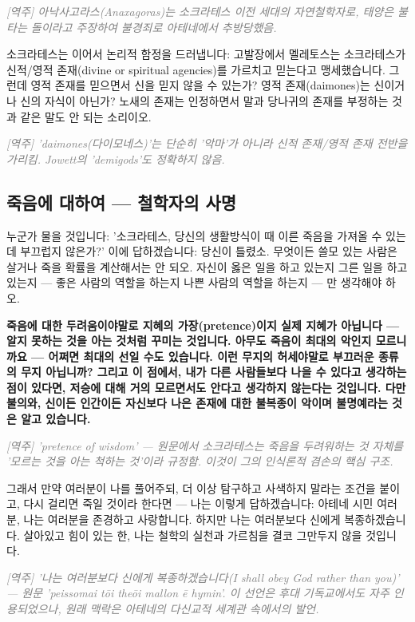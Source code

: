 \documentclass[11pt, a4paper]{article}
\newcommand{\tnote}[1]{\par\noindent\textit{\textcolor{gray}{[역주] #1}}\par\smallskip}
\begin{document}
\tnote{아낙사고라스(Anaxagoras)는 소크라테스 이전 세대의 자연철학자로, 태양은 불타는 돌이라고 주장하여 불경죄로 아테네에서 추방당했음.}


소크라테스는 이어서 논리적 함정을 드러냅니다: 고발장에서 멜레토스는 소크라테스가 신적/영적 존재(divine or spiritual agencies)를 가르치고 믿는다고 맹세했습니다. 그런데 영적 존재를 믿으면서 신을 믿지 않을 수 있는가? 영적 존재(daimones)는 신이거나 신의 자식이 아닌가? 노새의 존재는 인정하면서 말과 당나귀의 존재를 부정하는 것과 같은 말도 안 되는 소리이오.


\tnote{'daimones(다이모네스)'는 단순히 '악마'가 아니라 신적 존재/영적 존재 전반을 가리킴. Jowett의 'demigods'도 정확하지 않음.}


\bigskip


\subsection{죽음에 대하여 — 철학자의 사명}


누군가 물을 것입니다: '소크라테스, 당신의 생활방식이 때 이른 죽음을 가져올 수 있는데 부끄럽지 않은가?' 이에 답하겠습니다: 당신이 틀렸소. 무엇이든 쓸모 있는 사람은 살거나 죽을 확률을 계산해서는 안 되오. 자신이 옳은 일을 하고 있는지 그른 일을 하고 있는지 — 좋은 사람의 역할을 하는지 나쁜 사람의 역할을 하는지 — 만 생각해야 하오.


\textbf{죽음에 대한 두려움이야말로 지혜의 가장(pretence)이지 실제 지혜가 아닙니다 — 알지 못하는 것을 아는 것처럼 꾸미는 것입니다. 아무도 죽음이 최대의 악인지 모르니까요 — 어쩌면 최대의 선일 수도 있습니다. 이런 무지의 허세야말로 부끄러운 종류의 무지 아닙니까? 그리고 이 점에서, 내가 다른 사람들보다 나을 수 있다고 생각하는 점이 있다면, 저승에 대해 거의 모르면서도 안다고 생각하지 않는다는 것입니다. 다만 불의와, 신이든 인간이든 자신보다 나은 존재에 대한 불복종이 악이며 불명예라는 것은 알고 있습니다.}


\tnote{'pretence of wisdom' — 원문에서 소크라테스는 죽음을 두려워하는 것 자체를 '모르는 것을 아는 척하는 것'이라 규정함. 이것이 그의 인식론적 겸손의 핵심 구조.}


그래서 만약 여러분이 나를 풀어주되, 더 이상 탐구하고 사색하지 말라는 조건을 붙이고, 다시 걸리면 죽일 것이라 한다면 — 나는 이렇게 답하겠습니다: 아테네 시민 여러분, 나는 여러분을 존경하고 사랑합니다. 하지만 나는 여러분보다 신에게 복종하겠습니다. 살아있고 힘이 있는 한, 나는 철학의 실천과 가르침을 결코 그만두지 않을 것입니다.


\tnote{'나는 여러분보다 신에게 복종하겠습니다(I shall obey God rather than you)' — 원문 'peissomai tōi theōi mallon ē hymin'. 이 선언은 후대 기독교에서도 자주 인용되었으나, 원래 맥락은 아테네의 다신교적 세계관 속에서의 발언.}
\end{document}
